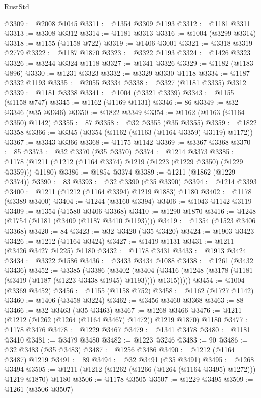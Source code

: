 \begin{lexlean}{RustStd}
\begin{coremodule}
@3309 := @2008 @1045
@3311 := @1354 @3309 @1193
@3312 := @1181 @3311
@3313 := @3308 @3312
@3314 := @1181 @3313
@3316 := @1004 (@3299 @3314)
@3318 := @1155 (@1158 @722)
@3319 := @1406 @3001
@3321 := @3318 @3319 @2779
@3322 := @1187 @1870
@3323 := @3322 @1193
@3324 := @1426 @3323
@3326 := @3244 @3324 @1118
@3327 := @1341 @3326
@3329 := @1182 (@1183 @896)
@3330 := @1231 @3323
@3332 := @3329 @3330 @1118
@3334 := @1187 @3332 @1193
@3335 := @2055 @3334
@3338 := @3327 (@1181 @3335) @3312
@3339 := @1181 @3338
@3341 := @1004 (@3321 @3339)
@3343 := @1155 (@1158 @747)
@3345 := @1162 (@1169 @1131)
@3346 := 86
@3349 := @32 @3346 (@35 @3346)
@3350 := @1822 @3349
@3354 := @1162 (@1163 (@1164 @3350) @1142)
@3355 := 87
@3358 := @32 @3355 (@35 @3355)
@3359 := @1822 @3358
@3366 := @3345 (@3354 (@1162 (@1163 (@1164 @3359) @3119) @1172))
@3367 := @3343 @3366
@3368 := @1175 @1142
@3369 := @3367 @3368
@3370 := 85
@3373 := @32 @3370 (@35 @3370)
@3374 := @1214 @3373
@3385 := @1178 (@1211 (@1212 (@1164 @3374) @1219 (@1223 (@1229 @3350) (@1229 @3359))) @1180)
@3386 := @1854 @3374
@3389 := @1211 (@1862 (@1229 @3374))
@3390 := 83
@3393 := @32 @3390 (@35 @3390)
@3394 := @1214 @3393
@3400 := @1211 (@1212 (@1164 @3394) @1219 @1883) @1180
@3402 := @1178 (@3389 @3400)
@3404 := @1244 (@3160 @3394)
@3406 := @1043 @1142 @3119
@3409 := @1354 (@1580 @3406 @3368)
@3410 := @1290 @1870
@3416 := @1248 (@1754 (@1181 (@3409 (@1187 @3410 @1193))))
@3419 := @1354 (@1523 @3406 @3368)
@3420 := 84
@3423 := @32 @3420 (@35 @3420)
@3424 := @1903 @3423
@3426 := @1212 (@1164 @3424)
@3427 := @1419 @1131
@3431 := @1211 (@3426 @3427 @1225) @1180
@3432 := @1178 @3431
@3433 := @1913 @3424
@3434 := @3322 @1586
@3436 := @3433 @3434 @1088
@3438 := @1261 (@3432 @3436)
@3452 := @3385
    (@3386
      (@3402
        (@3404 (@3416 (@1248 (@3178 (@1181 (@3419 (@1187 (@1223 @3438 @1945) @1193)))) @1315)))))
@3454 := @1004 (@3369 @3452)
@3456 := @1155 (@1158 @752)
@3458 := @1162 (@1727 @1142)
@3460 := @1406 (@3458 @3224)
@3462 := @3456 @3460 @3368
@3463 := 88
@3466 := @32 @3463 (@35 @3463)
@3467 := @1268 @3466
@3476 := @1211 (@1212 (@1262 (@1264 (@1164 @3467) @1472)) @1219 @1870) @1180
@3477 := @1178 @3476
@3478 := @1229 @3467
@3479 := @1341 @3478
@3480 := @1181 @3410
@3481 := @3479 @3480
@3482 := @1223 @3246
@3483 := 90
@3486 := @32 @3483 (@35 @3483)
@3487 := @1256 @3486
@3490 := @1212 (@1164 @3487) @1219
@3491 := 89
@3494 := @32 @3491 (@35 @3491)
@3495 := @1268 @3494
@3505 := @1211 (@1212 (@1262 (@1266 (@1264 (@1164 @3495) @1272))) @1219 @1870) @1180
@3506 := @1178 @3505
@3507 := @1229 @3495
@3509 := @1261 (@3506 @3507)

\end{coremodule}
\end{lexlean}
